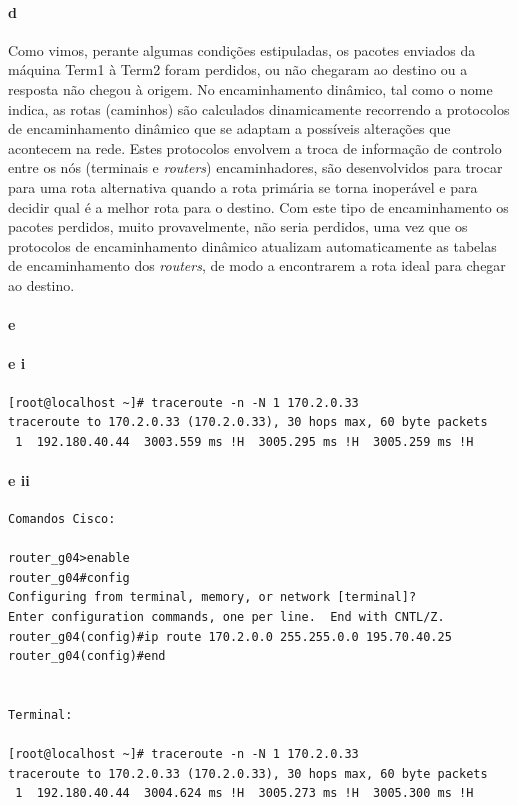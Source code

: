 \paragraph{d}
Como vimos, perante algumas condições estipuladas, os pacotes enviados da máquina \textsf{Term1} à \textsf{Term2} foram perdidos, ou não chegaram ao destino ou a resposta não chegou à origem.
No encaminhamento dinâmico, tal como o nome indica, as rotas (caminhos) são calculados dinamicamente recorrendo a protocolos de encaminhamento dinâmico que se adaptam a possíveis alterações que acontecem na rede. Estes protocolos envolvem a troca de informação de controlo entre os nós (terminais e \emph{routers}) encaminhadores, são desenvolvidos para trocar para uma rota alternativa quando a rota primária se torna inoperável e para decidir qual é a melhor rota para o destino.
Com este tipo de encaminhamento os pacotes perdidos, muito provavelmente, não seria perdidos, uma vez que os protocolos de encaminhamento dinâmico atualizam automaticamente as tabelas de encaminhamento dos \emph{routers}, de modo a encontrarem a rota ideal para chegar ao destino.

\paragraph{e}

\paragraph{e i}
\begin{verbatim}
[root@localhost ~]# traceroute -n -N 1 170.2.0.33
traceroute to 170.2.0.33 (170.2.0.33), 30 hops max, 60 byte packets
 1  192.180.40.44  3003.559 ms !H  3005.295 ms !H  3005.259 ms !H                                                            
\end{verbatim}
\paragraph{e ii}
\begin{verbatim}
Comandos Cisco:

router_g04>enable
router_g04#config
Configuring from terminal, memory, or network [terminal]? 
Enter configuration commands, one per line.  End with CNTL/Z.
router_g04(config)#ip route 170.2.0.0 255.255.0.0 195.70.40.25
router_g04(config)#end


Terminal:

[root@localhost ~]# traceroute -n -N 1 170.2.0.33
traceroute to 170.2.0.33 (170.2.0.33), 30 hops max, 60 byte packets
 1  192.180.40.44  3004.624 ms !H  3005.273 ms !H  3005.300 ms !H                                                      
\end{verbatim}

